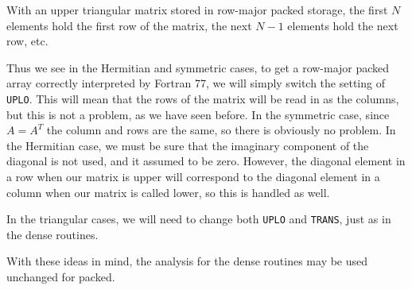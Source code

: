 \documentclass{article}
\begin{document}
With an upper triangular matrix stored in row-major packed storage, the first
$N$ elements hold the first row of the matrix, the next $N-1$ elements hold
the next row, etc.

Thus we see in the Hermitian and symmetric cases, to get a row-major packed
array correctly interpreted by Fortran 77, we will simply switch the setting
of {\tt UPLO}.  This will mean that the rows of the matrix will be read in as the
columns, but this is not a problem, as we have seen before.  In the symmetric case,
since $A = A^T$ the column and rows are the same, so there is obviously no
problem.  In the Hermitian case, we must be sure that the imaginary component
of the diagonal is not used, and it assumed to be zero.  However, the diagonal
element in a row when our matrix is upper will correspond to the diagonal
element in a column when our matrix is called lower, so this is handled as well.

In the triangular cases, we will need to change both {\tt UPLO} and {\tt TRANS},
just as in the dense routines.

With these ideas in mind, the analysis for the dense routines may be used
unchanged for packed.
\clearpage
\end{document}
